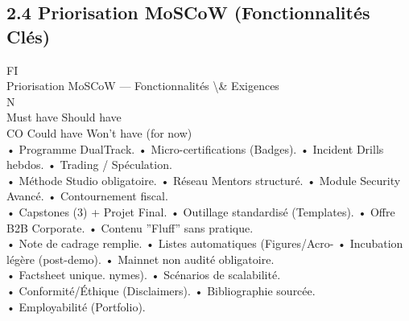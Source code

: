\documentclass[12pt,landscape,a4paper]{article}
\begin{document}
\subsection{2.4 Priorisation MoSCoW (Fonctionnalités Clés)}
\vspace{0.5em}
\vspace{0.5em}
\vspace{0.5em}
\vspace{0.5em}
FI\\
Priorisation MoSCoW — Fonctionnalités \textbackslash{}& Exigences\\
\vspace{0.5em}
\vspace{0.5em}
\vspace{0.5em}
\vspace{0.5em}
N\\
Must have                             Should have\\
CO                          Could have                              Won’t have (for now)\\
• Programme DualTrack.                • Micro-certifications (Badges).       • Incident Drills hebdos.               • Trading / Spéculation.\\
• Méthode Studio obligatoire.         • Réseau Mentors structuré.            • Module Security Avancé.               • Contournement fiscal.\\
• Capstones (3) + Projet Final.       • Outillage standardisé (Templates).   • Offre B2B Corporate.                  • Contenu ”Fluff” sans pratique.\\
• Note de cadrage remplie.            • Listes automatiques (Figures/Acro-   • Incubation légère (post-demo).        • Mainnet non audité obligatoire.\\
• Factsheet unique.                   nymes).                                • Scénarios de scalabilité.\\
• Conformité/Éthique (Disclaimers).   • Bibliographie sourcée.\\
• Employabilité (Portfolio).\\
\vspace{0.5em}
\vspace{0.5em}
\vspace{0.5em}
\vspace{0.5em}
\end{document}
